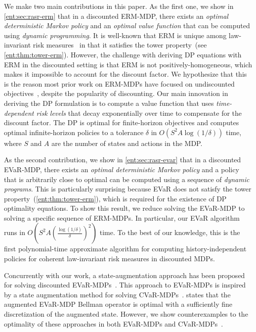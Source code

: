 \documentclass[twoside]{article}
\theoremstyle{plain}
\theoremstyle{definition}
\theoremstyle{remark}
\renewcommand{\cite}[1]{\citep{#1}}
\begin{document}
We make two main contributions in this paper. As the first one, we show in \cref{ent:sec:rasr-erm} that in a discounted ERM-MDP, there exists an \emph{optimal deterministic Markov policy} and an \emph{optimal value function} that can be computed using \emph{dynamic programming}. It is well-known that ERM is unique among law-invariant risk measures~\cite{Kupper2006} in that it satisfies the tower property~(see \cref{ent:thm:tower-erm}). However, the challenge with deriving DP equations with ERM in the discounted setting is that ERM is not positively-homogeneous, which makes it impossible to account for the discount factor. We hypothesize that this is the reason most prior work on ERM-MDPs have focused on undiscounted objectives~\cite{Borkar2002a,neu2017unified}, despite the popularity of discounting. Our main innovation in deriving the DP formulation is to compute a value function that uses \emph{time-dependent risk levels} that decay exponentially over time to compensate for the discount factor. The DP is optimal for finite-horizon objectives and computes optimal infinite-horizon policies to a tolerance $\delta$ in $O(S^2 A \log(1/\delta))$ time, where $S$ and $A$ are the number of states and actions in the MDP.

As the second contribution, we show in \cref{ent:sec:rasr-evar} that in a discounted EVaR-MDP, there exists an \emph{optimal deterministic Markov policy} and a policy that is arbitrarily close to optimal can be computed using a sequence of \emph{dynamic programs}. This is particularly surprising because EVaR does not satisfy the tower property~(\cref{ent:thm:tower-erm}), which is required for the existence of DP optimality equations. To show this result, we reduce solving the EVaR-MDP to solving a specific sequence of ERM-MDPs. In particular, our EVaR algorithm runs in $O(S^2 A (\frac{\log(1/\delta)}{\delta})^2)$ time. To the best of our knowledge, this is the first polynomial-time approximate algorithm for computing history-independent policies for coherent law-invariant risk measures in discounted MDPs.

Concurrently with our work, a state-augmentation approach has been proposed for solving discounted EVaR-MDPs~\cite{Ni2022,Ni2022a}. This approach to EVaR-MDPs is inspired by a state augmentation method for solving CVaR-MDPs~\cite{Chow2015}. \citet{Ni2022} states that the augmented EVaR-MDP Bellman operator is optimal with a sufficiently fine discretization of the augmented state. However, we show counterexamples to the optimality of these approaches in both EVaR-MDPs and CVaR-MDPs~\cite{Hau2023a}.
\end{document}
